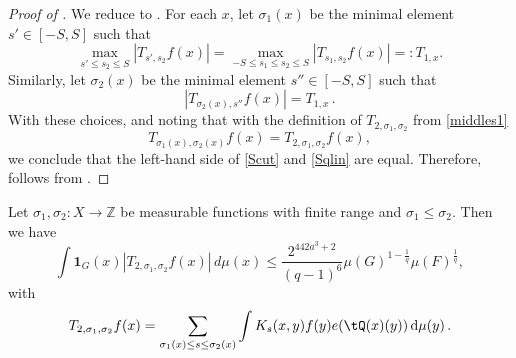\begin{proof}[Proof of ]
    \leanok
    We reduce  to . For each $x$, let $\sigma_1(x)$ be the
    minimal element $s'\in [-S,S]$ such that
    \[
    \max_{s'\le s_2\le S} |T_{s',s_2} f(x)| = \max_{-S\le s_1\le s_2\le S} |T_{s_1,s_2} f(x)| =: T_{1,x}.
    \]
    Similarly, let ${\sigma}_2(x)$ be the minimal element $s''\in [-S,S]$ such that
    \[
    |T_{\sigma_2(x), s''} f(x)| = T_{1,x}\,.
    \]
    With these choices, and noting that with the definition of $T_{2, \sigma_1, \sigma_2}$ from \eqref{middles1}
    \begin{equation*}
    T_{\sigma_1(x),\sigma_2(x)} f(x)=T_{2,\sigma_1,\sigma_2} f(x),
    \end{equation*}
    we conclude that the left-hand side of \eqref{Scut} and \eqref{Sqlin} are equal.
    Therefore,  follows from .
\end{proof}

\begin{lemma}
    \label{linearized-truncation}
    \leanok
    Let $\sigma_1,\sigma_2\colon X\to \mathbb{Z}$ be measurable functions with finite range and $\sigma_1\leq \sigma_2$.
    Then we have
    \begin{equation} \label{Sqlin}
        \int \mathbf{1}_{G}(x)
        \left| {T}_{2,\sigma_1,\sigma_2}f(x)\right|\, d\mu(x)
        \le \frac{2^{442a^3+2}}{(q-1)^6} \mu(G)^{1-\frac{1}{q}} \mu(F)^{\frac{1}{q}},
    \end{equation}
    with
    \begin{equation}\label{middles1}
        {T}_{2,\sigma_1,\sigma_2}f(x)=\sum_{\sigma_1(x) \le s\le \sigma_2(x)}
        \int K_s(x,y) f(y) e(\tQ(x)(y)) \, \mathrm{d}\mu(y)\,.
    \end{equation}
\end{lemma}

